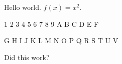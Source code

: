 \documentclass[a4paper]{article}
\begin{document}
Hello world. $f(x)=x^2$.


{ 1 2 3 4 5 6 7 8 9 A B C D E F}


{\foo G H I J K L M N O P Q R S T U V}


Did this work?
\end{document}
